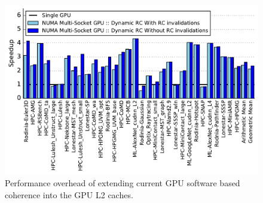 \begin{figure}[t]
    \centering
    \includegraphics[width=1.0\columnwidth]{figures/plot_no_inval_WB.pdf}
    \caption{Performance overhead of extending current GPU software based coherence
    into the GPU L2 caches.}
    \label{fig:invalidations}
\end{figure}